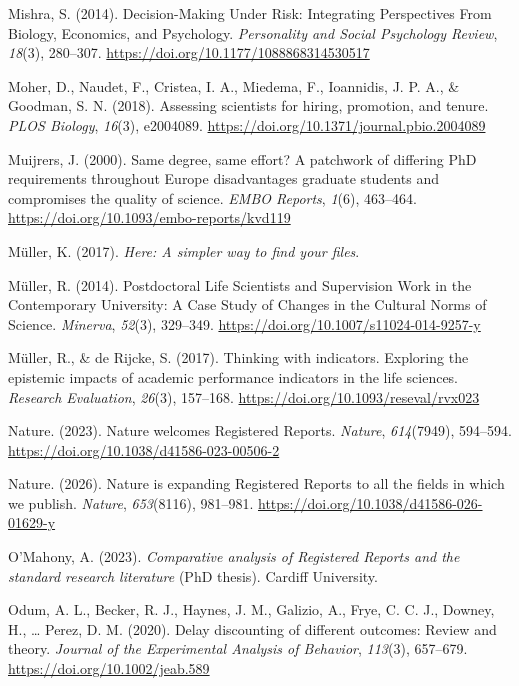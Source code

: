 \documentclass[
  british,
  a4paper,
  ,man,mask,floatsintext]{apa6}
\newlength{\cslhangindent}
\newenvironment{CSLReferences}[2] %
 {\begin{list}{}{%
  \setlength{\itemindent}{0pt}
  \setlength{\leftmargin}{0pt}
  \setlength{\parsep}{0pt}
  \ifodd #1
   \setlength{\leftmargin}{\cslhangindent}
   \setlength{\itemindent}{-1\cslhangindent}
  \fi
  \setlength{\itemsep}{#2\baselineskip}}}
 {\end{list}}
\begin{document}
\begin{CSLReferences}{1}{0}
Mishra, S. (2014). Decision-{Making Under Risk}: {Integrating Perspectives From Biology}, {Economics}, and {Psychology}. \emph{Personality and Social Psychology Review}, \emph{18}(3), 280--307. \url{https://doi.org/10.1177/1088868314530517}

Moher, D., Naudet, F., Cristea, I. A., Miedema, F., Ioannidis, J. P. A., \& Goodman, S. N. (2018). Assessing scientists for hiring, promotion, and tenure. \emph{PLOS Biology}, \emph{16}(3), e2004089. \url{https://doi.org/10.1371/journal.pbio.2004089}

Muijrers, J. (2000). Same degree, same effort? {A} patchwork of differing {PhD} requirements throughout {Europe} disadvantages graduate students and compromises the quality of science. \emph{EMBO Reports}, \emph{1}(6), 463--464. \url{https://doi.org/10.1093/embo-reports/kvd119}

Müller, K. (2017). \emph{Here: {A} simpler way to find your files}.

Müller, R. (2014). Postdoctoral {Life Scientists} and {Supervision Work} in the {Contemporary University}: {A Case Study} of {Changes} in the {Cultural Norms} of {Science}. \emph{Minerva}, \emph{52}(3), 329--349. \url{https://doi.org/10.1007/s11024-014-9257-y}

Müller, R., \& de Rijcke, S. (2017). Thinking with indicators. {Exploring} the epistemic impacts of academic performance indicators in the life sciences. \emph{Research Evaluation}, \emph{26}(3), 157--168. \url{https://doi.org/10.1093/reseval/rvx023}

Nature. (2023). Nature welcomes {Registered Reports}. \emph{Nature}, \emph{614}(7949), 594--594. \url{https://doi.org/10.1038/d41586-023-00506-2}

Nature. (2026). Nature is expanding {Registered Reports} to all the fields in which we publish. \emph{Nature}, \emph{653}(8116), 981--981. \url{https://doi.org/10.1038/d41586-026-01629-y}

O'Mahony, A. (2023). \emph{Comparative analysis of {Registered Reports} and the standard research literature} (PhD thesis). Cardiff University.

Odum, A. L., Becker, R. J., Haynes, J. M., Galizio, A., Frye, C. C. J., Downey, H., \ldots{} Perez, D. M. (2020). Delay discounting of different outcomes: {Review} and theory. \emph{Journal of the Experimental Analysis of Behavior}, \emph{113}(3), 657--679. \url{https://doi.org/10.1002/jeab.589}


\end{CSLReferences}
\end{document}
